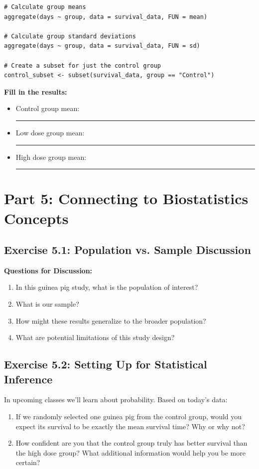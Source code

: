 \documentclass[11pt]{article}
\begin{document}
\begin{lstlisting}
# Calculate group means
aggregate(days ~ group, data = survival_data, FUN = mean)

# Calculate group standard deviations
aggregate(days ~ group, data = survival_data, FUN = sd)

# Create a subset for just the control group
control_subset <- subset(survival_data, group == "Control")
\end{lstlisting}

\textbf{Fill in the results:}
\begin{itemize}
\item Control group mean: \rule{3cm}{0.4pt}
\item Low dose group mean: \rule{3cm}{0.4pt}
\item High dose group mean: \rule{3cm}{0.4pt}
\end{itemize}

\section{Part 5: Connecting to Biostatistics Concepts}

\subsection{Exercise 5.1: Population vs. Sample Discussion}

\textbf{Questions for Discussion:}
\begin{enumerate}
\item In this guinea pig study, what is the population of interest?
\item What is our sample?
\item How might these results generalize to the broader population?
\item What are potential limitations of this study design?
\end{enumerate}

\subsection{Exercise 5.2: Setting Up for Statistical Inference}

In upcoming classes we'll learn about probability. Based on today's data:

\begin{enumerate}
\item If we randomly selected one guinea pig from the control group, would you expect its survival to be exactly the mean survival time? Why or why not?

\item How confident are you that the control group truly has better survival than the high dose group? What additional information would help you be more certain?
\end{enumerate}
\end{document}

